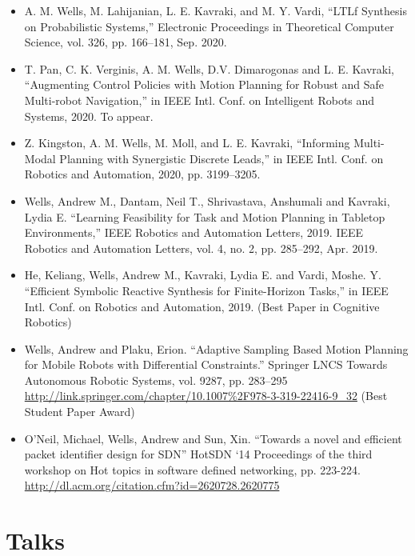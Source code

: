 \documentclass[11pt,a4paper,sans]{moderncv}        %
\begin{document}
\begin{itemize}

\item{A. M. Wells, M. Lahijanian, L. E. Kavraki, and M. Y. Vardi, “LTLf Synthesis on Probabilistic Systems,” Electronic Proceedings in Theoretical Computer Science, vol. 326, pp. 166–181, Sep. 2020.}

\item{T. Pan, C. K. Verginis, A. M. Wells, D.V. Dimarogonas and L. E. Kavraki, “Augmenting Control Policies with Motion Planning for Robust and Safe Multi-robot Navigation,” in IEEE Intl. Conf. on Intelligent Robots and Systems, 2020. To appear.}

\item{Z. Kingston, A. M. Wells, M. Moll, and L. E. Kavraki, “Informing Multi-Modal Planning with Synergistic Discrete Leads,” in IEEE Intl. Conf. on Robotics and Automation, 2020, pp. 3199–3205.}

\item{Wells, Andrew M., Dantam, Neil T., Shrivastava, Anshumali and Kavraki, Lydia E.  “Learning Feasibility for Task and Motion Planning in Tabletop Environments,” IEEE Robotics and Automation Letters, 2019. IEEE Robotics and Automation Letters, vol. 4, no. 2, pp. 285–292, Apr. 2019.}

\item{He, Keliang, Wells, Andrew M., Kavraki, Lydia E. and Vardi, Moshe. Y.  “Efficient Symbolic Reactive Synthesis for Finite-Horizon Tasks,” in IEEE Intl. Conf. on Robotics and Automation, 2019. (Best Paper in Cognitive Robotics)}

\item{Wells, Andrew and Plaku, Erion.  “Adaptive Sampling Based Motion Planning for Mobile Robots with Differential Constraints.” Springer LNCS Towards Autonomous Robotic Systems, vol. 9287, pp. 283–295 \url{http://link.springer.com/chapter/10.1007%2F978-3-319-22416-9_32} (Best Student Paper Award)}

\item{O’Neil, Michael, Wells, Andrew and Sun, Xin. “Towards a novel and efficient packet identifier design for SDN” HotSDN ‘14 Proceedings of the third workshop on Hot topics in software defined networking, pp. 223-224. \url{http://dl.acm.org/citation.cfm?id=2620728.2620775}}

\end{itemize}

\section{Talks}
\end{document}
